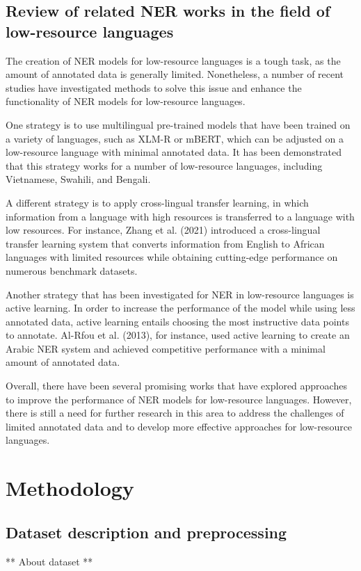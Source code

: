 \documentclass[a4paper,12pt]{report}
\begin{document}
\section{Review of related NER works in the field of low-resource languages}
The creation of NER models for low-resource languages is a tough task, as the amount of annotated data is generally limited. Nonetheless, a number of recent studies have investigated methods to solve this issue and enhance the functionality of NER models for low-resource languages.
\par
One strategy is to use multilingual pre-trained models that have been trained on a variety of languages, such as XLM-R or mBERT, which can be adjusted on a low-resource language with minimal annotated data. It has been demonstrated that this strategy works for a number of low-resource languages, including Vietnamese, Swahili, and Bengali.
\par
A different strategy is to apply cross-lingual transfer learning, in which information from a language with high resources is transferred to a language with low resources. For instance, Zhang et al. (2021)\cite{crosslanguage} introduced a cross-lingual transfer learning system that converts information from English to African languages with limited resources while obtaining cutting-edge performance on numerous benchmark datasets.
\par
Another strategy that has been investigated for NER in low-resource languages is active learning. In order to increase the performance of the model while using less annotated data, active learning entails choosing the most instructive data points to annotate. Al-Rfou et al. (2013), for instance, used active learning to create an Arabic NER system and achieved competitive performance with a minimal amount of annotated data.
\par
Overall, there have been several promising works that have explored approaches to improve the performance of NER models for low-resource languages. However, there is still a need for further research in this area to address the challenges of limited annotated data and to develop more effective approaches for low-resource languages.

\chapter{Methodology}\label{cap:methodology}
\section{Dataset description and preprocessing}
** About dataset **
\end{document}
